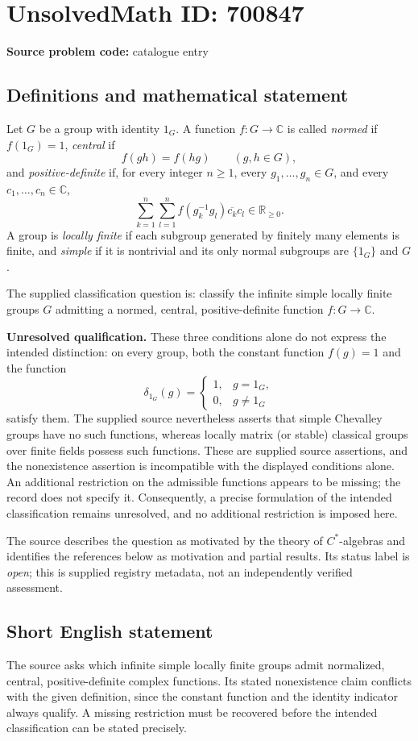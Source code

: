 \documentclass[11pt]{article}
\newcommand{\R}{\mathbb{R}}
\newcommand{\C}{\mathbb{C}}
\begin{document}
\section*{UnsolvedMath ID: 700847}
\textbf{Source problem code:} catalogue entry
\subsection{Definitions and mathematical statement}
Let \(G\) be a group with identity \(1_G\). A function \(f\colon G\to\C\) is called \emph{normed} if \(f(1_G)=1\), \emph{central} if
\[
 f(gh)=f(hg)\qquad(g,h\in G),
\]
and \emph{positive-definite} if, for every integer \(n\geq1\), every \(g_1,\ldots,g_n\in G\), and every \(c_1,\ldots,c_n\in\C\),
\[
 \sum_{k=1}^{n}\sum_{l=1}^{n} f(g_k^{-1}g_l)\overline{c_k}c_l\in\R_{\geq0}.
\]
A group is \emph{locally finite} if each subgroup generated by finitely many elements is finite, and \emph{simple} if it is nontrivial and its only normal subgroups are \(\{1_G\}\) and \(G\).

The supplied classification question is: classify the infinite simple locally finite groups \(G\) admitting a normed, central, positive-definite function \(f\colon G\to\C\).

\textbf{Unresolved qualification.} These three conditions alone do not express the intended distinction: on every group, both the constant function \(f(g)=1\) and the function
\[
 \delta_{1_G}(g)=\begin{cases}1,&g=1_G,\\0,&g\neq1_G\end{cases}
\]
satisfy them. The supplied source nevertheless asserts that simple Chevalley groups have no such functions, whereas locally matrix (or stable) classical groups over finite fields possess such functions. These are supplied source assertions, and the nonexistence assertion is incompatible with the displayed conditions alone. An additional restriction on the admissible functions appears to be missing; the record does not specify it. Consequently, a precise formulation of the intended classification remains unresolved, and no additional restriction is imposed here.

The source describes the question as motivated by the theory of \(C^*\)-algebras and identifies the references below as motivation and partial results. Its status label is \emph{open}; this is supplied registry metadata, not an independently verified assessment.
\subsection{Short English statement}
The source asks which infinite simple locally finite groups admit normalized, central, positive-definite complex functions. Its stated nonexistence claim conflicts with the given definition, since the constant function and the identity indicator always qualify. A missing restriction must be recovered before the intended classification can be stated precisely.
\end{document}
